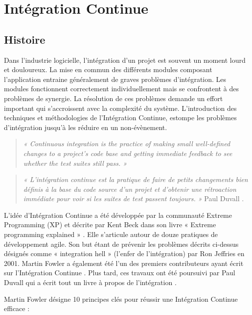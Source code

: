 \chapter{Intégration Continue} \label{ContinousIntegration}

  \section{Histoire}
  Dans l’industrie logicielle, l’intégration d’un projet est souvent un moment lourd et douloureux. La mise en commun des différents modules composant l’application entraine généralement de graves problèmes d’intégration. Les modules fonctionnent correctement individuellement mais se confrontent à des problèmes de synergie. La résolution de ces problèmes demande un effort important qui s’accroissent avec la complexité du système. L’introduction des techniques et méthodologies de l’Intégration Continue, estompe les problèmes d’intégration jusqu’à les réduire en un non-évènement.\\

  \begin{quotation}
    \emph{« Continuous integration is the practice of making small well-defined changes to a project’s code base and getting immediate feedback to see whether the test suites still pass. »}
  \end{quotation}

  \begin{quotation}
    \emph{« L'intégration continue est la pratique de faire de petits changements bien définis à la base du code source d'un projet et d'obtenir une rétroaction immédiate pour voir si les suites de test passent toujours. »} Paul Duvall \cite{Duv07}.\\
  \end{quotation}

  L’idée d'Intégration Continue a été développée par la communauté Extreme Programming (XP) et décrite par Kent Beck dans son livre « Extreme programming explained » \cite{Bec99}. Elle s'articule autour de douze pratiques de développement agile. Son but étant de prévenir les problèmes décrits ci-dessus désignés comme « integration hell » (l’enfer de l’intégration) par Ron Jeffries en 2001. Martin Fowler a également été l'un des premiers contributeurs ayant écrit sur l’Intégration Continue \cite{Fow00}. Plus tard, ces travaux ont été poursuivi par Paul Duvall qui a écrit tout un livre à propos de l’intégration \cite{Duv07}.

  Martin Fowler \cite{Fow00} désigne 10 principes clés pour réussir une Intégration Continue efficace :\\

